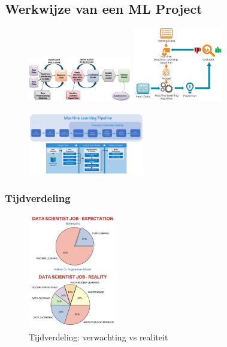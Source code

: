 \documentclass{article}
\begin{document}
\subsection{Werkwijze van een ML Project}

\begin{figure}[H]
    \centering
    \includegraphics[width=0.4\textwidth]{machine-learning-project.png}
    \includegraphics[width=0.35\textwidth]{machine-learning-project2.png}
    \caption{}
\end{figure}

\begin{figure}[H]
    \centering
    \includegraphics[width=0.45\textwidth]{machine-learning-project3.png}
    \caption{}
\end{figure}

\subsubsection{Tijdverdeling}


\begin{figure}[H]
    \centering
    \includegraphics[width=0.35\textwidth]{machine-learning-project4.png}
    \caption{Tijdverdeling: verwachting vs realiteit}
\end{figure}
\end{document}
